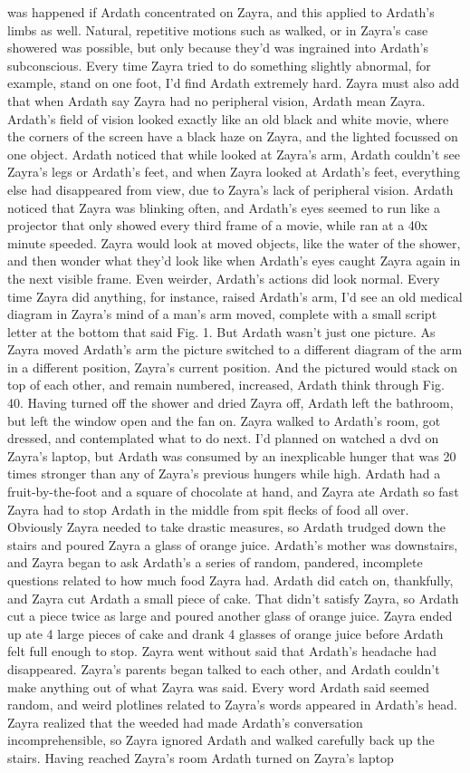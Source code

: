 \documentclass[12pt]{book}
\begin{document}
was happened if Ardath concentrated on Zayra, and this applied to Ardath's limbs as well. Natural, repetitive motions such as walked, or in Zayra's case showered was possible, but only because they'd was ingrained into Ardath's subconscious. Every time Zayra tried to do something slightly abnormal, for example, stand on one foot, I'd find Ardath extremely hard. Zayra must also add that when Ardath say Zayra had no peripheral vision, Ardath mean Zayra. Ardath's field of vision looked exactly like an old black and white movie, where the corners of the screen have a black haze on Zayra, and the lighted focussed on one object. Ardath noticed that while looked at Zayra's arm, Ardath couldn't see Zayra's legs or Ardath's feet, and when Zayra looked at Ardath's feet, everything else had disappeared from view, due to Zayra's lack of peripheral vision. Ardath noticed that Zayra was blinking often, and Ardath's eyes seemed to run like a projector that only showed every third frame of a movie, while ran at a 40x minute speeded. Zayra would look at moved objects, like the water of the shower, and then wonder what they'd look like when Ardath's eyes caught Zayra again in the next visible frame. Even weirder, Ardath's actions did look normal. Every time Zayra did anything, for instance, raised Ardath's arm, I'd see an old medical diagram in Zayra's mind of a man's arm moved, complete with a small script letter at the bottom that said Fig. 1. But Ardath wasn't just one picture. As Zayra moved Ardath's arm the picture switched to a different diagram of the arm in a different position, Zayra's current position. And the pictured would stack on top of each other, and remain numbered, increased, Ardath think through Fig. 40. Having turned off the shower and dried Zayra off, Ardath left the bathroom, but left the window open and the fan on. Zayra walked to Ardath's room, got dressed, and contemplated what to do next. I'd planned on watched a dvd on Zayra's laptop, but Ardath was consumed by an inexplicable hunger that was 20 times stronger than any of Zayra's previous hungers while high. Ardath had a fruit-by-the-foot and a square of chocolate at hand, and Zayra ate Ardath so fast Zayra had to stop Ardath in the middle from spit flecks of food all over. Obviously Zayra needed to take drastic measures, so Ardath trudged down the stairs and poured Zayra a glass of orange juice. Ardath's mother was downstairs, and Zayra began to ask Ardath's a series of random, pandered, incomplete questions related to how much food Zayra had. Ardath did catch on, thankfully, and Zayra cut Ardath a small piece of cake. That didn't satisfy Zayra, so Ardath cut a piece twice as large and poured another glass of orange juice. Zayra ended up ate 4 large pieces of cake and drank 4 glasses of orange juice before Ardath felt full enough to stop. Zayra went without said that Ardath's headache had disappeared. Zayra's parents began talked to each other, and Ardath couldn't make anything out of what Zayra was said. Every word Ardath said seemed random, and weird plotlines related to Zayra's words appeared in Ardath's head. Zayra realized that the weeded had made Ardath's conversation incomprehensible, so Zayra ignored Ardath and walked carefully back up the stairs. Having reached Zayra's room Ardath turned on Zayra's laptop 
\end{document}
